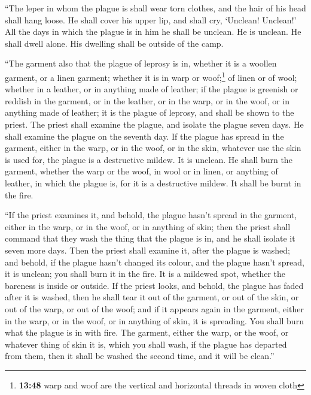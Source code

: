  ``The leper in whom the plague is shall wear torn
clothes, and the hair of his head shall hang loose. He shall cover his
upper lip, and shall cry, `Unclean! Unclean!'  All the
days in which the plague is in him he shall be unclean. He is unclean.
He shall dwell alone. His dwelling shall be outside of the camp.

 ``The garment also that the plague of leprosy is in,
whether it is a woollen garment, or a linen garment; 
whether it is in warp or woof;\footnote{\textbf{13:48} warp and woof are
  the vertical and horizontal threads in woven cloth} of linen or of
wool; whether in a leather, or in anything made of leather;
 if the plague is greenish or reddish in the garment, or
in the leather, or in the warp, or in the woof, or in anything made of
leather; it is the plague of leprosy, and shall be shown to the priest.
 The priest shall examine the plague, and isolate the
plague seven days.  He shall examine the plague on the
seventh day. If the plague has spread in the garment, either in the
warp, or in the woof, or in the skin, whatever use the skin is used for,
the plague is a destructive mildew. It is unclean.  He
shall burn the garment, whether the warp or the woof, in wool or in
linen, or anything of leather, in which the plague is, for it is a
destructive mildew. It shall be burnt in the fire.

 ``If the priest examines it, and behold, the plague
hasn't spread in the garment, either in the warp, or in the woof, or in
anything of skin;  then the priest shall command that
they wash the thing that the plague is in, and he shall isolate it seven
more days.  Then the priest shall examine it, after the
plague is washed; and behold, if the plague hasn't changed its colour,
and the plague hasn't spread, it is unclean; you shall burn it in the
fire. It is a mildewed spot, whether the bareness is inside or outside.
 If the priest looks, and behold, the plague has faded
after it is washed, then he shall tear it out of the garment, or out of
the skin, or out of the warp, or out of the woof;  and if
it appears again in the garment, either in the warp, or in the woof, or
in anything of skin, it is spreading. You shall burn what the plague is
in with fire.  The garment, either the warp, or the woof,
or whatever thing of skin it is, which you shall wash, if the plague has
departed from them, then it shall be washed the second time, and it will
be clean.''

